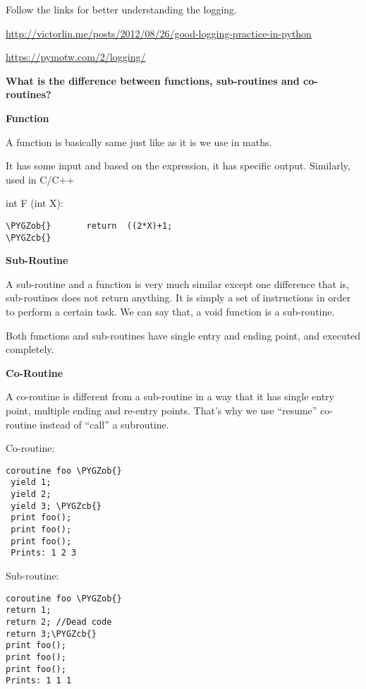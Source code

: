 \documentclass[letterpaper,10pt,english]{sphinxmanual}
\def\PYGZob{\char`\{}
\def\PYGZcb{\char`\}}
\begin{document}
Follow the links for better understanding the logging.

\href{http://victorlin.me/posts/2012/08/26/good-logging-practice-in-python}{http://victorlin.me/posts/2012/08/26/good-logging-practice-in-python}

\href{https://pymotw.com/2/logging/}{https://pymotw.com/2/logging/}

\textbf{What is the difference between functions, sub-routines and co-routines?}

\textbf{Function}

A function is basically same just like as it is we use in maths.
\begin{quote}

\end{quote}

It has some input and based on the expression, it has specific output. Similarly, used in C/C++

int  F (int X):

\begin{Verbatim}[commandchars=\\\{\}]
\PYGZob{}       return  ((2*X)+1;
\PYGZcb{}
\end{Verbatim}

\textbf{Sub-Routine}

A sub-routine and a function is very much similar except one difference that is, sub-routines does not return anything. It is simply a set of instructions in order to perform a certain task.
We can say that, a void  function is a sub-routine.

Both functions and sub-routines have single entry and ending point, and executed completely.

\textbf{Co-Routine}

A co-routine is different from a sub-routine in a way that it has single entry point, multiple ending and re-entry points. That's why we use “resume” co-routine instead of “call” a subroutine.

Co-routine:

\begin{Verbatim}[commandchars=\\\{\}]
coroutine foo \PYGZob{}
 yield 1;
 yield 2;
 yield 3; \PYGZcb{}
 print foo();
 print foo();
 print foo();
 Prints: 1 2 3
\end{Verbatim}

Sub-routine:

\begin{Verbatim}[commandchars=\\\{\}]
coroutine foo \PYGZob{}
return 1;
return 2; //Dead code
return 3;\PYGZcb{}
print foo();
print foo();
print foo();
Prints: 1 1 1
\end{Verbatim}
\end{document}
